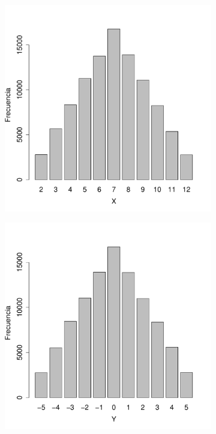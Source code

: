 \documentclass[paper=leter, fontsize=11pt]{scrartcl}
\begin{document}
\begin{figure}
    \begin{subfigure}{.5\textwidth}
        \centering
        \includegraphics[scale=0.4]{247_6_X.pdf}
        \label{247_6_X}
    \end{subfigure}
    \begin{subfigure}{0.5\textwidth}
        \centering
        \includegraphics[scale=0.4]{247_6_Y.pdf}

\end{subfigure}
\end{figure}
\end{document}
